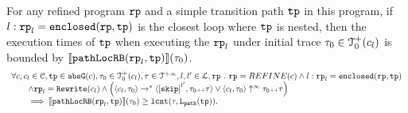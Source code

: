 \begin{lem}
  \label{lem:pathlocalrb-sound}
  For any refined program $\mathtt{rp}$ and a simple transition path $\mathtt{tp}$ in this program,
  if $l: \mathtt{rp}_l = \mathtt{enclosed}(\mathtt{rp}, \mathtt{tp})$ is the closest loop where $\mathtt{tp}$ is nested,
  then the execution times of $\mathtt{tp}$ when executing the $\mathtt{rp}_l$ under initial trace $\mathtt{\tau}_0 \in \mathcal{T}^{+}_0(c_l)$ is bounded by $\llbracket \mathtt{pathLocRB}(\mathtt{rp}_l, \mathtt{tp}) \rrbracket(\mathtt{\tau}_0)$.
  \[
    \begin{array}{l}
    \forall c, c_l \in \cdom, \tpath \in \absG(c), \trace_0 \in \ftdom_0(c_l), \trace \in \tdom, l, l' \in \ldom, \rprog \st 
    \rprog = REFINE(c)
    \land
    l: \rprog_l = \kw{enclosed}(\rprog, \tpath)
    \\ \qquad
    \land 
    \rprog_l = \algrewrite(c_l)
    \land
    \Big(
    \config{c_l, \trace_0} \rightarrow^* \config{\clabel{\eskip}^{l'}, \trace_0 \tracecat \trace}
    \lor \config{c_l, \trace_0} \uparrow^{\infty} \trace_0 \tracecat \trace 
    \Big)
    \\ \qquad
    \implies
    \econfig{\outinB(\rprog_l, \tpath)}(\trace_0) \geq \lcounter(\trace, \pathl(\tpath)).
    \end{array}
  \]  
\end{lem}